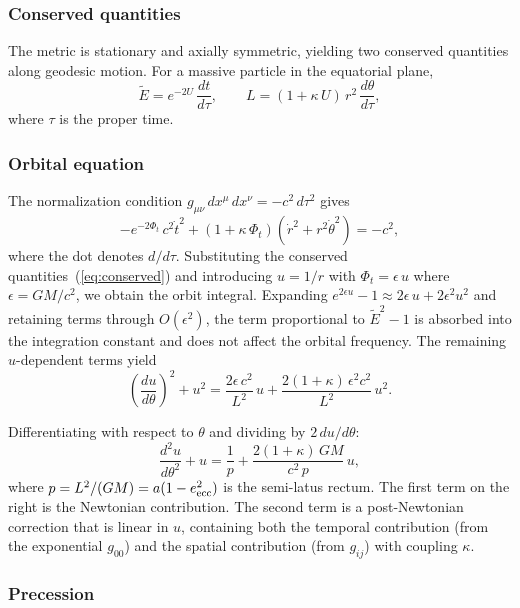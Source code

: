\documentclass[12pt]{article}
\begin{document}
\subsubsection{Conserved quantities}

The metric is stationary and axially symmetric, yielding two conserved quantities along geodesic motion. For a massive particle in the equatorial plane,
\begin{equation}
\tilde{E} = e^{-2U}\,\frac{dt}{d\tau}, \qquad L = (1 + \kappa\,U)\,r^2\,\frac{d\theta}{d\tau},
\label{eq:conserved}
\end{equation}
where $\tau$ is the proper time.

\subsubsection{Orbital equation}

The normalization condition $g_{\mu\nu}\,dx^\mu\,dx^\nu = -c^2\,d\tau^2$ gives
$$
-e^{-2\Phi_t}\,c^2\dot{t}^2 + (1 + \kappa\,\Phi_t)\left(\dot{r}^2 + r^2\dot{\theta}^2\right) = -c^2,
$$
where the dot denotes $d/d\tau$. Substituting the conserved quantities~(\ref{eq:conserved}) and introducing $u = 1/r$ with $\Phi_t = \epsilon\,u$ where $\epsilon = GM/c^2$, we obtain the orbit integral. Expanding $e^{2\epsilon u} - 1 \approx 2\epsilon\,u + 2\epsilon^2 u^2$ and retaining terms through $O(\epsilon^2)$, the term proportional to $\tilde{E}^2 - 1$ is absorbed into the integration constant and does not affect the orbital frequency. The remaining $u$-dependent terms yield
$$
\left(\frac{du}{d\theta}\right)^2 + u^2 = \frac{2\epsilon\,c^2}{L^2}\,u + \frac{2(1+\kappa)\,\epsilon^2 c^2}{L^2}\,u^2.
$$

Differentiating with respect to $\theta$ and dividing by $2\,du/d\theta$:
\begin{equation}
\frac{d^2 u}{d\theta^2} + u = \frac{1}{p} + \frac{2(1+\kappa)\,GM}{c^2\,p}\,u,
\label{eq:orbit_equation}
\end{equation}
where $p = L^2/(GM) = a(1 - e_{\rm ecc}^2)$ is the semi-latus rectum. The first term on the right is the Newtonian contribution. The second term is a post-Newtonian correction that is linear in $u$, containing both the temporal contribution (from the exponential $g_{00}$) and the spatial contribution (from $g_{ij}$) with coupling $\kappa$.

\subsubsection{Precession}
\end{document}
